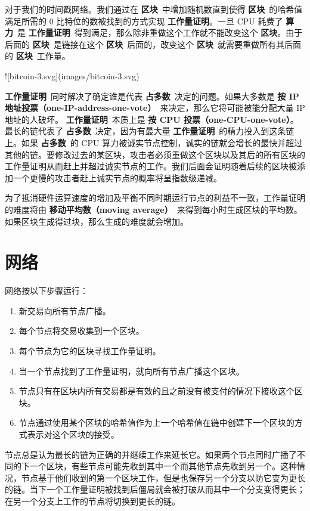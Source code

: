 \documentclass{article}
\begin{document}
对于我们的时间戳网络。我们通过在 \textbf{区块}\ 中增加随机数直到使得 \textbf{区块}\ 的哈希值满足所需的 0 比特位的数被找到的方式实现 \textbf{工作量证明}。一旦 CPU 耗费了 \textbf{算力}\ 是 \textbf{工作量证明}\ 得到满足，那么除非重做这个工作就不能改变这个 \textbf{区块}。由于后面的 \textbf{区块}\ 是链接在这个 \textbf{区块}\ 后面的，改变这个 \textbf{区块}\ 就需要重做所有其后面的 \textbf{区块}\ 工作量。

![bitcoin-3.svg](images/bitcoin-3.svg)

\textbf{工作量证明}\ 同时解决了确定谁是代表 \textbf{占多数}\ 决定的问题。如果大多数是 \textbf{按 IP 地址投票（one-IP-address-one-vote）}\ 来决定，那么它将可能被能分配大量 IP 地址的人破坏。 \textbf{工作量证明}\ 本质上是 \textbf{按 CPU 投票（one-CPU-one-vote）}。最长的链代表了 \textbf{占多数}\ 决定，因为有最大量 \textbf{工作量证明}\ 的精力投入到这条链上。如果 \textbf{占多数}\ 的 CPU 算力被诚实节点控制，诚实的链就会增长的最快并超过其他的链。要修改过去的某区块，攻击者必须重做这个区块以及其后的所有区块的工作量证明从而赶上并超过诚实节点的工作。我们后面会证明随着后续的区块被添加一个更慢的攻击者赶上诚实节点的概率将呈指数级递减。

为了抵消硬件运算速度的增加及平衡不同时期运行节点的利益不一致，工作量证明的难度将由 \textbf{移动平均数（moving average）}\ 来得到每小时生成区块的平均数。如果区块生成得过块，那么生成的难度就会增加。

\section{网络}
网络按以下步骤运行：

\begin{enumerate}
 \item 新交易向所有节点广播。
 \item 每个节点将交易收集到一个区块。
 \item 每个节点为它的区块寻找工作量证明。
 \item 当一个节点找到了工作量证明，就向所有节点广播这个区块。
 \item 节点只有在区块内所有交易都是有效的且之前没有被支付的情况下接收这个区块。
 \item 节点通过使用某个区块的哈希值作为上一个哈希值在链中创建下一个区块的方式表示对这个区块的接受。
\end{enumerate}

节点总是认为最长的链为正确的并继续工作来延长它。如果两个节点同时广播了不同的下一个区块，有些节点可能先收到其中一个而其他节点先收到另一个。这种情况，节点基于他们收到的第一个区块工作，但是也保存另一个分支以防它变为更长的链。当下一个工作量证明被找到后僵局就会被打破从而其中一个分支变得更长；在另一个分支上工作的节点将切换到更长的链。
\end{document}
